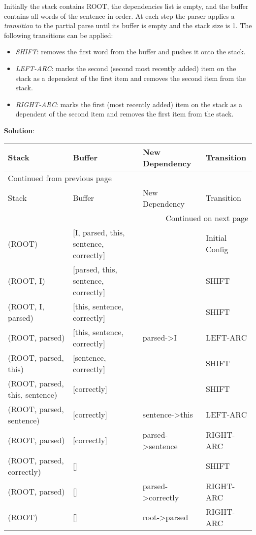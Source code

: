 \documentclass[10pt]{article}
\begin{document}
Initially the stack contains ROOT, the dependencies list is empty, and the buffer contains all words of the sentence 
in order. At each step the parser applies a \emph{transition} to the partial parse until its buffer is empty and the stack 
size is 1. The following transitions can be applied:

\begin{itemize}
\item \emph{SHIFT}: removes the first word from the buffer and pushes it onto the stack.
\item \emph{LEFT-ARC}: marks the second (second most recently added) item on the stack as a dependent of the first item and 
removes the second item from the stack.
\item \emph{RIGHT-ARC}: marks the first (most recently added) item on the stack as a dependent of the second item and removes
the first item from the stack.\\
\end{itemize}

\textbf{Solution}:

\begin{longtable}{|l|l|l|l|}
Stack & Buffer & New Dependency & Transition\\
\hline
\endfirsthead
\multicolumn{4}{l}{Continued from previous page} \\
\hline

Stack & Buffer & New Dependency & Transition \\

\hline
\endhead
\hline\multicolumn{4}{r}{Continued on next page} \\
\endfoot
\endlastfoot
\hline
(ROOT) & [I, parsed, this, sentence, correctly] &  & Initial Config\\
(ROOT, I) & [parsed, this, sentence, correctly] &  & SHIFT\\
(ROOT, I, parsed) & [this, sentence, correctly] &  & SHIFT\\
(ROOT, parsed) & [this, sentence, correctly] & parsed->I & LEFT-ARC\\
(ROOT, parsed, this) & [sentence, correctly] &  & SHIFT\\
(ROOT, parsed, this, sentence) & [correctly] &  & SHIFT\\
(ROOT, parsed, sentence) & [correctly] & sentence->this & LEFT-ARC\\
(ROOT, parsed) & [correctly] & parsed->sentence & RIGHT-ARC\\
(ROOT, parsed, correctly) & [] &  & SHIFT\\
(ROOT, parsed) & [] & parsed->correctly & RIGHT-ARC\\
(ROOT) & [] & root->parsed & RIGHT-ARC\\
\end{longtable}
\end{document}
